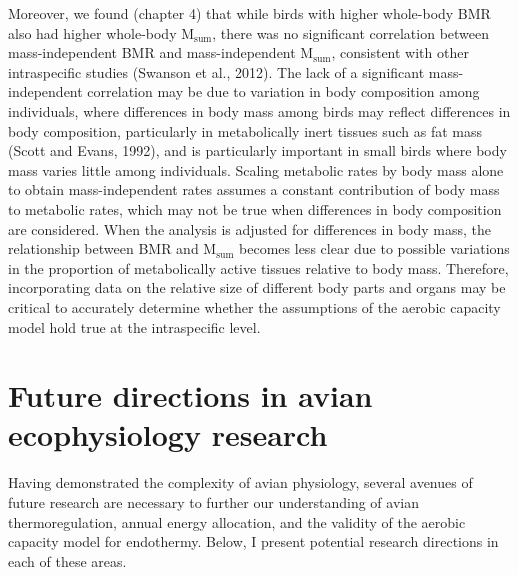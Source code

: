 \documentclass[10pt, twoside]{book} %
\begin{document}
Moreover, we found (chapter 4) that while birds with higher whole-body BMR also had higher whole-body M$_{\text{sum}}$, there was no significant correlation between mass-independent BMR and mass-independent M$_{\text{sum}}$, consistent with other intraspecific studies (Swanson et al., 2012). The lack of a significant mass-independent correlation may be due to variation in body composition among individuals, where differences in body mass among birds may reflect differences in body composition, particularly in metabolically inert tissues such as fat mass (Scott and Evans, 1992), and is particularly important in small birds where body mass varies little among individuals. Scaling metabolic rates by body mass alone to obtain mass-independent rates assumes a constant contribution of body mass to metabolic rates, which may not be true when differences in body composition are considered. When the analysis is adjusted for differences in body mass, the relationship between BMR and M$_{\text{sum}}$ becomes less clear due to possible variations in the proportion of metabolically active tissues relative to body mass. Therefore, incorporating data on the relative size of different body parts and organs may be critical to accurately determine whether the assumptions of the aerobic capacity model hold true at the intraspecific level.\\

\section{Future directions in avian ecophysiology research}

Having demonstrated the complexity of avian physiology, several avenues of future research are necessary to further our understanding of avian thermoregulation, annual energy allocation, and the validity of the aerobic capacity model for endothermy. Below, I present potential research directions in each of these areas.\\
\end{document}
